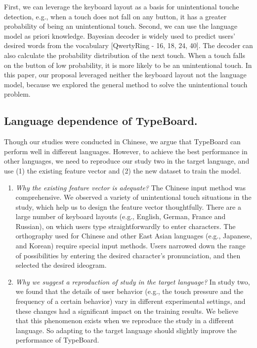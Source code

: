 First, we can leverage the keyboard layout as a basis for unintentional touche detection, e.g., when a touch does not fall on any button, it has a greater probability of being an unintentional touch. Second, we can use the language model as priori knowledge. Bayesian decoder is widely used to predict users’ desired words from the vocabulary [QwertyRing - 16, 18, 24, 40]. The decoder can also calculate the probability distribution of the next touch. When a touch falls on the button of low probability, it is more likely to be an unintentional touch. In this paper, our proposal leveraged neither the keyboard layout not the language model, because we explored the general method to solve the unintentional touch problem.


\subsection{Language dependence of TypeBoard.}

Though our studies were conducted in Chinese, we argue that TypeBoard can perform well in different languages. However, to achieve the best performance in other languages, we need to reproduce our study two in the target language, and use (1) the existing feature vector and (2) the new dataset to train the model.

\begin{enumerate}
	\item{\emph{Why the existing feature vector is adequate?} The Chinese input method was comprehensive. We observed a variety of unintentional touch situations in the study, which help us to design the feature vector thoughtfully. There are a large number of keyboard layouts (e.g., English, German, France and Russian), on which users type straightforwardly to enter characters. The orthography used for Chinese and other East Asian languages (e.g., Japanese, and Korean) require special input methods. Users narrowed down the range of possibilities by entering the desired character's pronunciation, and then selected the desired ideogram.}
	\item{\emph{Why we suggest a reproduction of study in the target language?} In study two, we found that the details of user behavior (e.g., the touch pressure and the frequency of a certain behavior) vary in different experimental settings, and these changes had a significant impact on the training results. We believe that this phenomenon exists when we reproduce the study in a different language. So adapting to the target language should slightly improve the performance of TypeBoard.}
\end{enumerate}

